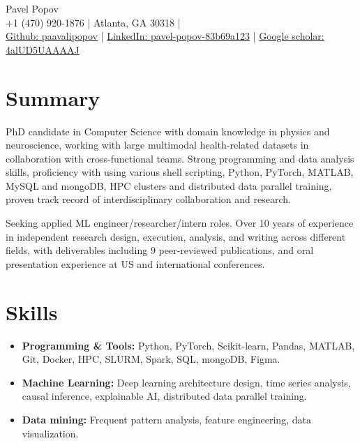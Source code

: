 \documentclass[11pt,a4paper]{article}
\begin{document}
\begin{center}
  {\Huge Pavel Popov}\\[0.5em]
  {\footnotesize +1 (470) 920-1876 \quad | \quad Atlanta, GA 30318} \quad | \\
  {\small \href{https://github.com/paavalipopov}{Github: paavalipopov} \quad | \quad
  \href{https://www.linkedin.com/in/pavel-popov-83b69a123/}{LinkedIn: pavel-popov-83b69a123} \quad | \quad
  \href{https://scholar.google.com/citations?user=4alUD5UAAAAJ}{Google scholar: 4alUD5UAAAAJ}}
\end{center}

\section*{Summary}
{\small \noindent PhD candidate in Computer Science with domain knowledge in physics and neuroscience, working with large multimodal health-related datasets in collaboration with cross-functional teams.
Strong programming and data analysis skills, proficiency with using various shell scripting, Python, PyTorch, MATLAB, MySQL and mongoDB, HPC clusters and distributed data parallel training, proven track record of interdisciplinary collaboration and research.

\noindent Seeking applied ML engineer/researcher/intern roles. 
Over 10 years of experience in independent research design, execution, analysis, and writing across different fields, with deliverables including 9 peer-reviewed publications, and oral presentation experience at US and international conferences.}

\section*{Skills}
\begin{itemize}
[leftmargin=*,noitemsep] 
\item \textbf{Programming \& Tools:} Python, PyTorch, Scikit-learn, Pandas, MATLAB, Git, Docker, HPC, SLURM, Spark, SQL, mongoDB, Figma.
\item \textbf{Machine Learning:} Deep learning architecture design, time series analysis, causal inference, explainable AI, distributed data parallel training.
\item \textbf{Data mining:} Frequent pattern analysis, feature engineering, data visualization.
\end{itemize}
\end{document}
